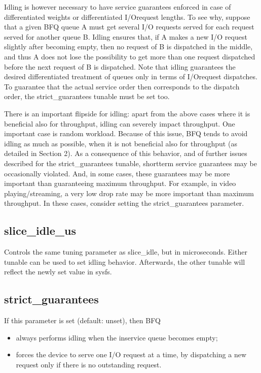 \documentclass[a4paper,11pt,english]{sphinxmanual}
\begin{document}
Idling is however necessary to have service guarantees enforced in
case of differentiated weights or differentiated I/O\sphinxhyphen{}request lengths.
To see why, suppose that a given BFQ queue A must get several I/O
requests served for each request served for another queue B. Idling
ensures that, if A makes a new I/O request slightly after becoming
empty, then no request of B is dispatched in the middle, and thus A
does not lose the possibility to get more than one request dispatched
before the next request of B is dispatched. Note that idling
guarantees the desired differentiated treatment of queues only in
terms of I/O\sphinxhyphen{}request dispatches. To guarantee that the actual service
order then corresponds to the dispatch order, the strict\_guarantees
tunable must be set too.

There is an important flipside for idling: apart from the above cases
where it is beneficial also for throughput, idling can severely impact
throughput. One important case is random workload. Because of this
issue, BFQ tends to avoid idling as much as possible, when it is not
beneficial also for throughput (as detailed in Section 2). As a
consequence of this behavior, and of further issues described for the
strict\_guarantees tunable, short\sphinxhyphen{}term service guarantees may be
occasionally violated. And, in some cases, these guarantees may be
more important than guaranteeing maximum throughput. For example, in
video playing/streaming, a very low drop rate may be more important
than maximum throughput. In these cases, consider setting the
strict\_guarantees parameter.


\subsection{slice\_idle\_us}
\label{\detokenize{bfq-iosched:slice-idle-us}}
Controls the same tuning parameter as slice\_idle, but in microseconds.
Either tunable can be used to set idling behavior.  Afterwards, the
other tunable will reflect the newly set value in sysfs.


\subsection{strict\_guarantees}
\label{\detokenize{bfq-iosched:strict-guarantees}}
If this parameter is set (default: unset), then BFQ
\begin{itemize}
\item {} 
always performs idling when the in\sphinxhyphen{}service queue becomes empty;

\item {} 
forces the device to serve one I/O request at a time, by dispatching a
new request only if there is no outstanding request.

\end{itemize}
\end{document}
